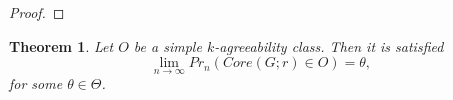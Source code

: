 \documentclass[11pt,notitlepage]{report}
\newtheorem{theorem}{Theorem}[chapter]
\theoremstyle{definition}
\theoremstyle{remark}
\newcommand{\R}{\mathbb{R}}
\newcommand{\N}{\mathbb{N}}
\newcommand{\Ln}{\lim\limits_{n\to \infty}}
\begin{document}
\begin{proof}
 
 
 
   
   
%   
%   
%   
%
%	


	\end{proof}


\begin{theorem}
	Let $O$ be a simple $k$-agreeability class. Then it is satisfied
	\[ \Ln Pr_n(Core(G;r)\in O) = \theta, \]
	for some $\theta\in \Theta$.
\end{theorem}
\end{document}
